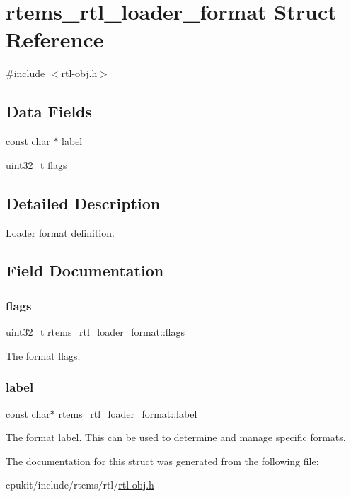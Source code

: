 \hypertarget{structrtems__rtl__loader__format}{}\section{rtems\+\_\+rtl\+\_\+loader\+\_\+format Struct Reference}
\label{structrtems__rtl__loader__format}


{\ttfamily \#include $<$rtl-\/obj.\+h$>$}

\subsection*{Data Fields}
\begin{DoxyCompactItemize}
\item 
const char $\ast$ \mbox{\hyperlink{structrtems__rtl__loader__format_a1347835cad11b5726d595dc512728727}{label}}
\item 
uint32\+\_\+t \mbox{\hyperlink{structrtems__rtl__loader__format_a53239fc1c91980e3568eaab844ee4b0f}{flags}}
\end{DoxyCompactItemize}


\subsection{Detailed Description}
Loader format definition. 

\subsection{Field Documentation}
\mbox{\label{structrtems__rtl__loader__format_a53239fc1c91980e3568eaab844ee4b0f}} 
\subsubsection{\texorpdfstring{flags}{flags}}
{\footnotesize\ttfamily uint32\+\_\+t rtems\+\_\+rtl\+\_\+loader\+\_\+format\+::flags}

The format flags. \mbox{\label{structrtems__rtl__loader__format_a1347835cad11b5726d595dc512728727}} 
\subsubsection{\texorpdfstring{label}{label}}
{\footnotesize\ttfamily const char$\ast$ rtems\+\_\+rtl\+\_\+loader\+\_\+format\+::label}

The format label. This can be used to determine and manage specific formats. 

The documentation for this struct was generated from the following file\+:\begin{DoxyCompactItemize}
\item 
cpukit/include/rtems/rtl/\mbox{\hyperlink{rtl-obj_8h}{rtl-\/obj.\+h}}\end{DoxyCompactItemize}
